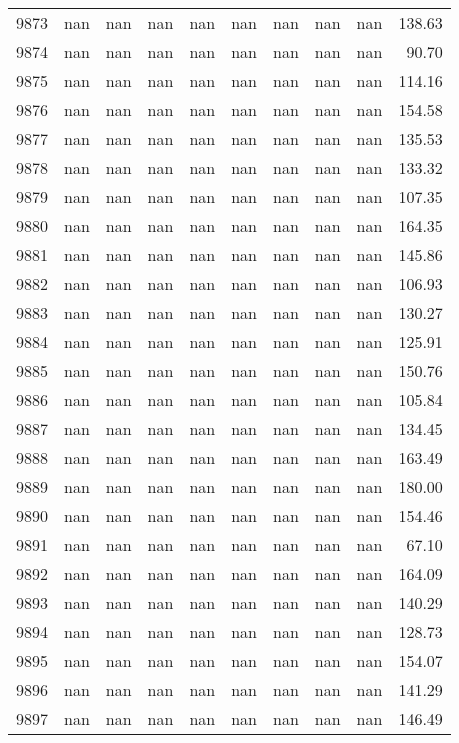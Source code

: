 \begin{tabular}{lrrrrrrrrr}
9873 & nan & nan & nan & nan & nan & nan & nan & nan & 138.63 \\
9874 & nan & nan & nan & nan & nan & nan & nan & nan & 90.70 \\
9875 & nan & nan & nan & nan & nan & nan & nan & nan & 114.16 \\
9876 & nan & nan & nan & nan & nan & nan & nan & nan & 154.58 \\
9877 & nan & nan & nan & nan & nan & nan & nan & nan & 135.53 \\
9878 & nan & nan & nan & nan & nan & nan & nan & nan & 133.32 \\
9879 & nan & nan & nan & nan & nan & nan & nan & nan & 107.35 \\
9880 & nan & nan & nan & nan & nan & nan & nan & nan & 164.35 \\
9881 & nan & nan & nan & nan & nan & nan & nan & nan & 145.86 \\
9882 & nan & nan & nan & nan & nan & nan & nan & nan & 106.93 \\
9883 & nan & nan & nan & nan & nan & nan & nan & nan & 130.27 \\
9884 & nan & nan & nan & nan & nan & nan & nan & nan & 125.91 \\
9885 & nan & nan & nan & nan & nan & nan & nan & nan & 150.76 \\
9886 & nan & nan & nan & nan & nan & nan & nan & nan & 105.84 \\
9887 & nan & nan & nan & nan & nan & nan & nan & nan & 134.45 \\
9888 & nan & nan & nan & nan & nan & nan & nan & nan & 163.49 \\
9889 & nan & nan & nan & nan & nan & nan & nan & nan & 180.00 \\
9890 & nan & nan & nan & nan & nan & nan & nan & nan & 154.46 \\
9891 & nan & nan & nan & nan & nan & nan & nan & nan & 67.10 \\
9892 & nan & nan & nan & nan & nan & nan & nan & nan & 164.09 \\
9893 & nan & nan & nan & nan & nan & nan & nan & nan & 140.29 \\
9894 & nan & nan & nan & nan & nan & nan & nan & nan & 128.73 \\
9895 & nan & nan & nan & nan & nan & nan & nan & nan & 154.07 \\
9896 & nan & nan & nan & nan & nan & nan & nan & nan & 141.29 \\
9897 & nan & nan & nan & nan & nan & nan & nan & nan & 146.49 \\

\end{tabular}
